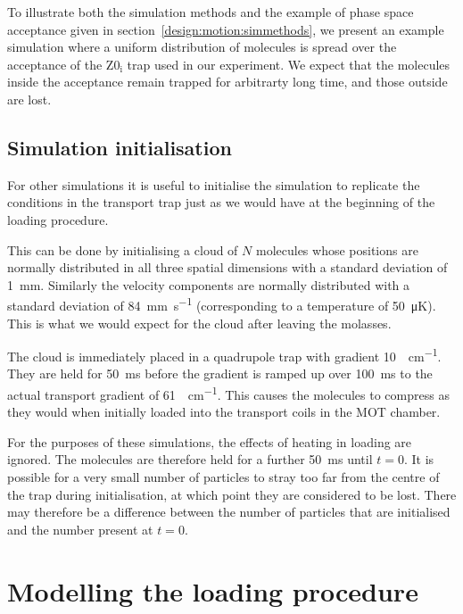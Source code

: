 To illustrate both the simulation methods and the example of phase space
acceptance given in section~\ref{design:motion:simmethods}, we present an
example simulation where a uniform distribution of molecules is spread over the
acceptance of the $\mathrm{Z0_i}$ trap used in our experiment. We expect that
the molecules inside the acceptance remain trapped for arbitrarty long time,
and those outside are lost.





\subsection{Simulation initialisation}

For other simulations it is useful to initialise the simulation to replicate
the conditions in the transport trap just as we would have at the beginning of
the loading procedure.

This can be done by initialising a cloud of $N$ molecules whose positions are
normally distributed in all three spatial dimensions with a standard deviation
of \SI{1}{\milli\meter}. Similarly the velocity components are normally
distributed with a standard deviation of \SI{84}{\milli\meter\per\second}
(corresponding to a temperature of \SI{50}{\micro\kelvin}). This is what we
would expect for the cloud after leaving the molasses.

The cloud is immediately placed in a quadrupole trap with gradient
\SI{10}{\gauss\per\centi\meter}. They are held for \SI{50}{\milli\second}
before the gradient is ramped up over \SI{100}{\milli\second} to the actual
transport gradient of \SI{61}{\gauss\per\centi\meter}. This causes the
molecules to compress as they would when initially loaded into the transport
coils in the MOT chamber.

For the purposes of these simulations, the effects of heating in loading are
ignored. The molecules are therefore held for a further \SI{50}{\milli\second}
until $t=0$. It is possible for a very small number of particles to stray too
far from the centre of the trap during initialisation, at which point they are
considered to be lost. There may therefore be a difference between the number
of particles that are initialised and the number present at $t=0$.

\section{Modelling the loading procedure}
\label{design:sim}

